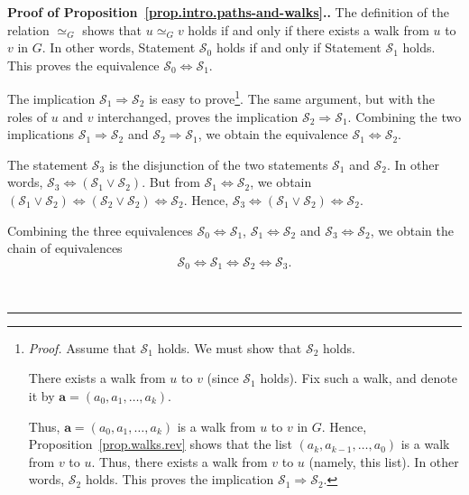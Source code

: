 \documentclass[numbers=enddot,12pt,final,onecolumn,notitlepage]{scrartcl}%
\theoremstyle{definition}
\newenvironment{proof}[1][Proof]{\noindent\textbf{#1.} }{\ \rule{0.5em}{0.5em}}
\newcommand{\tup}[1]{\left( #1 \right)}
\begin{document}
\begin{proof}[Proof of Proposition~\ref{prop.intro.paths-and-walks}.]
The definition of the relation $\simeq_G$ shows that $u \simeq_G v$
holds if and only if there exists a walk from $u$ to $v$ in $G$. In
other words, Statement $\mathcal{S}_0$ holds if and only if
Statement $\mathcal{S}_1$ holds. This proves the equivalence
$\mathcal{S}_0 \Longleftrightarrow \mathcal{S}_1$.

The implication $\mathcal{S}_1 \Longrightarrow \mathcal{S}_2$ is
easy to prove\footnote{\textit{Proof.} Assume that $\mathcal{S}_1$
holds. We must show that $\mathcal{S}_2$ holds.

There exists a walk from $u$ to $v$ (since $\mathcal{S}_1$ holds).
Fix such a walk, and denote it by
$\mathbf{a} = \tup{a_0, a_1, \ldots, a_k}$.

Thus, $\mathbf{a} = \tup{a_0, a_1, \ldots, a_k}$ is a walk from $u$
to $v$ in $G$. Hence, Proposition~\ref{prop.walks.rev} shows that the
list $\tup{a_k, a_{k-1}, \ldots, a_0}$ is a walk from $v$ to $u$.
Thus, there exists a walk from $v$ to $u$ (namely, this list). In
other words, $\mathcal{S}_2$ holds. This proves the implication
$\mathcal{S}_1 \Longrightarrow \mathcal{S}_2$.}. The same argument,
but with the roles of $u$ and $v$ interchanged, proves the implication
$\mathcal{S}_2 \Longrightarrow \mathcal{S}_1$. Combining the two
implications $\mathcal{S}_1 \Longrightarrow \mathcal{S}_2$ and
$\mathcal{S}_2 \Longrightarrow \mathcal{S}_1$, we obtain the
equivalence
$\mathcal{S}_1 \Longleftrightarrow \mathcal{S}_2$.

The statement $\mathcal{S}_3$ is the disjunction of the two statements
$\mathcal{S}_1$ and $\mathcal{S}_2$. In other words,
$\mathcal{S}_3 \Longleftrightarrow
\tup{\mathcal{S}_1 \vee \mathcal{S}_2}$. But from
$\mathcal{S}_1 \Longleftrightarrow \mathcal{S}_2$, we obtain
$\tup{\mathcal{S}_1 \vee \mathcal{S}_2}
\Longleftrightarrow \tup{\mathcal{S}_2 \vee \mathcal{S}_2}
\Longleftrightarrow \mathcal{S}_2$. Hence,
$\mathcal{S}_3 \Longleftrightarrow
\tup{\mathcal{S}_1 \vee \mathcal{S}_2}
\Longleftrightarrow \mathcal{S}_2$.

Combining the three equivalences
$\mathcal{S}_0 \Longleftrightarrow \mathcal{S}_1$,
$\mathcal{S}_1 \Longleftrightarrow \mathcal{S}_2$ and
$\mathcal{S}_3 \Longleftrightarrow \mathcal{S}_2$, we obtain the
chain of equivalences
\begin{equation}
\mathcal{S}_0 \Longleftrightarrow \mathcal{S}_1 \Longleftrightarrow
\mathcal{S}_2 \Longleftrightarrow \mathcal{S}_3 .
\label{pf.prop.intro.paths-and-walks.chain1}
\end{equation}


\end{proof}
\end{document}
